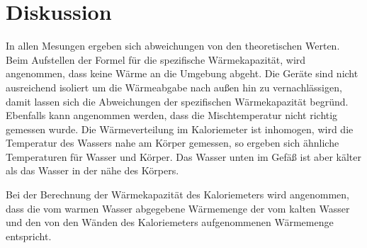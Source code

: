 \section{Diskussion}
\label{sec:Diskussion}
In allen Mesungen ergeben sich abweichungen von den theoretischen Werten.
Beim Aufstellen der Formel für die spezifische Wärmekapazität, wird angenommen, dass keine Wärme an die Umgebung abgeht.
Die Geräte sind nicht ausreichend isoliert um die Wärmeabgabe nach außen hin zu vernachlässigen, damit lassen sich die Abweichungen der spezifischen Wärmekapazität begründ.
Ebenfalls kann angenommen werden, dass die Mischtemperatur nicht richtig gemessen wurde. Die Wärmeverteilung im Kaloriemeter ist inhomogen, wird die Temperatur des Wassers nahe am
Körper gemessen, so ergeben sich ähnliche Temperaturen für Wasser und Körper. Das Wasser unten im Gefäß ist aber kälter als das Wasser in der nähe des Körpers.


Bei der Berechnung der Wärmekapazität des Kaloriemeters wird angenommen, dass die vom warmen Wasser abgegebene Wärmemenge
der vom kalten Wasser und den von den Wänden des Kaloriemeters aufgenommenen Wärmemenge entspricht.
